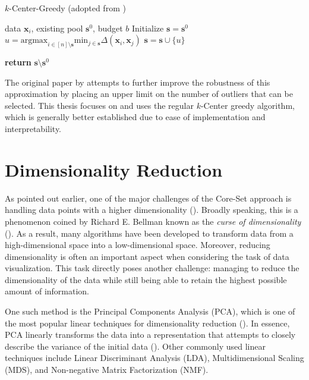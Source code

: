 \documentclass[english,bachelor,ul]{webisthesis} %
\begin{document}
\begin{algorithm}[htpb]
    \caption{$k$-Center-Greedy (adopted from \cite{DBLP:conf/iclr/SenerS18})}%
\label{alg:coreset}

\begin{algorithmic}

\Require data $ \mathbf{x}_i $, existing pool $ \mathbf{s}^0 $, budget $ b $
\State Initialize $ \mathbf{s} = \mathbf{s}^0 $
\Repeat
\State $ u = \text{argmax}_{i \in [n] \setminus \mathbf{s}} \text{min}_{j \in \mathbf{s}} \Delta(\mathbf{x}_i, \mathbf{x}_j) $
\State $ \mathbf{s} = \mathbf{s} \cup \{u\} $

\State \textbf{return} $\mathbf{s} \setminus \mathbf{s}^0 $
\end{algorithmic}
\end{algorithm}

The original paper by \cite{DBLP:conf/iclr/SenerS18} attempts to further improve the robustness of this approximation by placing an upper limit on the number of outliers that can be selected. This thesis focuses on and uses the regular $k$-Center greedy algorithm, which is generally better established due to ease of implementation and interpretability.

\section{Dimensionality Reduction}


As pointed out earlier, one of the major challenges of the Core-Set approach is handling data points with a higher dimensionality (\cite{DBLP:conf/iccv/SinhaED19}). Broadly speaking, this is a phenomenon coined by Richard E. Bellman known as the \textit{curse of dimensionality} (\cite{Freimer1961AdaptiveCP}). 
As a result, many algorithms have been developed to transform data from a high-dimensional space into a low-dimensional space. Moreover, reducing dimensionality is often an important aspect when considering the task of data visualization. This task directly poses another challenge: managing to reduce the dimensionality of the data while still being able to retain the highest possible amount of information. 

One such method is the Principal Components Analysis (PCA), which is one of the most popular linear techniques for dimensionality reduction (\cite{van2009dimensionality}). In essence, PCA linearly transforms the data into a representation that attempts to closely describe the variance of the initial data (\cite{jolliffe2016principal}). Other commonly used linear techniques include Linear Discriminant Analysis (LDA), Multidimensional Scaling (MDS), and Non-negative Matrix Factorization (NMF).
\end{document}
